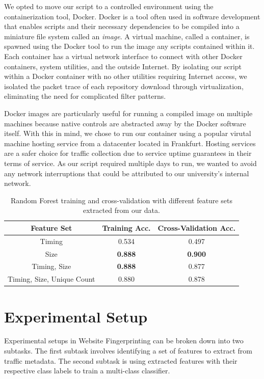 \documentclass[sigconf,authorversion,nonacm]{acmart}
\begin{document}
We opted to move our script to a controlled environment using the containerization tool, Docker. Docker is a tool often used in software development that enables scripts and their necessary dependencies to be compiled into a miniature file system called an \textit{image}. A virtual machine, called a container, is spawned using the Docker tool to run the image any scripts contained within it. Each container has a virtual network interface to connect with other Docker containers, system utilities, and the outside Internet. By isolating our script within a Docker container with no other utilities requiring Internet access, we isolated the packet trace of each repository download through virtualization, eliminating the need for complicated filter patterns.

Docker images are particularly useful for running a compiled image on multiple machines because native controls are abstracted away by the Docker software itself. With this in mind, we chose to run our container using a popular virutal machine hosting service from a datacenter located in Frankfurt. Hosting services are a safer choice for traffic collection due to service uptime guarantees in their terms of service. As our script required multiple days to run, we wanted to avoid any network interruptions that could be attributed to our university's internal network.


\begin{center}
  \begin{table}
    \begin{tabular}{ |c || c | c| }
      \hline 
      Feature Set& Training Acc.& Cross-Validation Acc.\\
      \hline
      Timing & 0.534 & 0.497 \\ 
      Size & \textbf{0.888} & \textbf{0.900} \\ 
      Timing, Size & \textbf{0.888} & 0.877 \\ 
      Timing, Size, Unique Count & 0.880 & 0.878 \\ 
      \hline
    \end{tabular}
    \caption{Random Forest training and cross-validation with different feature sets extracted from our data.}
    \label{table:featuresets}
  \end{table}
\end{center}
\section{Experimental Setup}
Experimental setups in Website Fingerprinting can be broken down into two subtasks. The first subtask involves identifying a set of features to extract from traffic metadata. The second subtask is using extracted features with their respective class labels to train a multi-class classifier.
\end{document}
